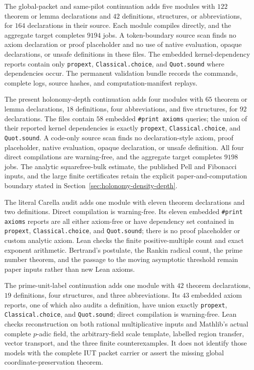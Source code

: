 \documentclass[11pt]{amsart}
\theoremstyle{definition}
\theoremstyle{remark}
\begin{document}
The global-packet and same-pilot continuation adds five modules with $122$
theorem or lemma declarations and $42$ definitions, structures, or
abbreviations, for $164$ declarations in their source.  Each module compiles
directly, and the aggregate target completes $9194$ jobs.  A token-boundary
source scan finds no axiom declaration or proof placeholder and no use of
native evaluation, opaque declarations, or unsafe definitions in these files.
The embedded kernel-dependency reports contain
only \texttt{propext}, \texttt{Classical.choice}, and \texttt{Quot.sound}
where dependencies occur.  The permanent validation bundle records the
commands, complete logs, source hashes, and computation-manifest replays.

The present holonomy-depth continuation adds four modules with $65$ theorem
or lemma declarations, $18$ definitions, four abbreviations, and five
structures, for $92$ declarations.  The files contain $58$ embedded
\texttt{\#print axioms} queries; the union of their reported kernel
dependencies is exactly \texttt{propext}, \texttt{Classical.choice}, and
\texttt{Quot.sound}.  A code-only source scan finds no declaration-style
axiom, proof placeholder, native evaluation, opaque declaration, or unsafe
definition.  All four direct compilations are warning-free, and the aggregate
target completes $9198$ jobs.  The analytic squarefree-bulk estimate, the
published Pell and Fibonacci inputs, and the large finite certificates retain
the explicit paper-and-computation boundary stated in
Section~\ref{sec:holonomy-density-depth}.

The literal Carella audit adds one module with eleven theorem declarations
and two definitions.  Direct compilation is warning-free.  Its eleven
embedded \texttt{\#print axioms} reports are all either axiom-free or have
dependency set contained in \texttt{propext}, \texttt{Classical.choice}, and
\texttt{Quot.sound}; there is no proof placeholder or custom analytic axiom.
Lean checks the finite positive-multiple count and exact exponent arithmetic.
Bertrand's postulate, the Rankin radical count, the prime number theorem, and
the passage to the moving asymptotic threshold remain paper inputs rather
than new Lean axioms.

The prime-unit-label continuation adds one module with $42$ theorem
declarations, $19$ definitions, four structures, and three abbreviations.
Its $43$ embedded axiom reports, one of which also audits a definition, have
union exactly
\texttt{propext}, \texttt{Classical.choice}, and \texttt{Quot.sound};
direct compilation is warning-free.  Lean checks reconstruction on both
rational multiplicative inputs and Mathlib's actual complete $p$-adic field,
the arbitrary-field scale template, labelled region transfer, vector
transport, and the three finite counterexamples.  It does not identify those
models with the complete IUT packet carrier or assert the missing global
coordinate-preservation theorem.
\end{document}

